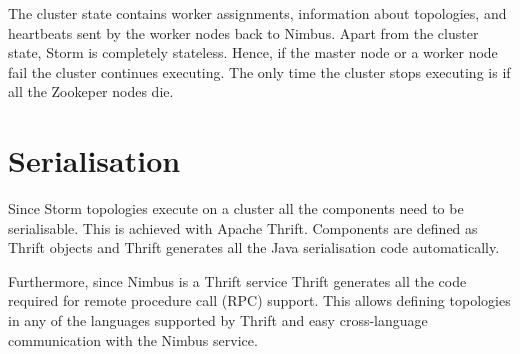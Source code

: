 The cluster state contains worker assignments, information about topologies, and heartbeats sent by the worker nodes back to Nimbus. Apart from the cluster state, Storm is completely stateless. Hence, if the master node or a worker node fail the cluster continues executing. The only time the cluster stops executing is if all the Zookeper nodes die.

\section{Serialisation}
\label{sec:serialisation}

Since Storm topologies execute on a cluster all the components need to be serialisable. This is achieved with Apache Thrift. Components are defined as Thrift objects and Thrift generates all the Java serialisation code automatically.


Furthermore, since Nimbus is a Thrift service Thrift generates all the code required for remote procedure call (RPC) support. This allows defining topologies in any of the languages supported by Thrift and easy cross-language communication with the Nimbus service.
